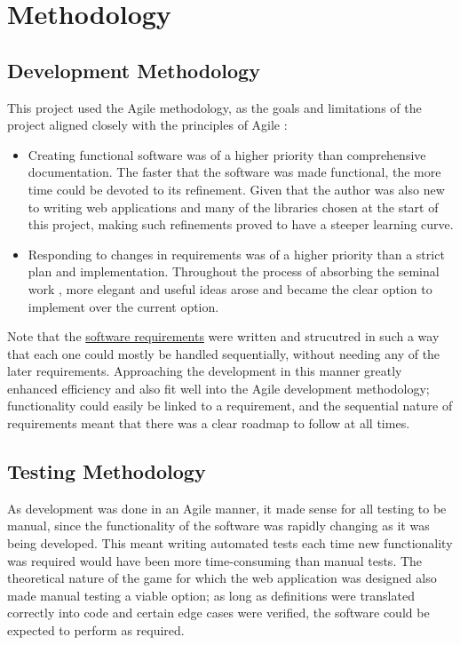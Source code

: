 \section{Methodology}

\subsection{Development Methodology}
This project used the Agile methodology, as the goals and limitations of the project aligned closely with the principles of Agile \cite{agilePrinciples}:
\begin{itemize}
    \item Creating functional software was of a higher priority than comprehensive documentation. The faster that the software was made functional, the more time could be devoted to its refinement. Given that the author was also new to writing web applications and many of the libraries chosen at the start of this project, making such refinements proved to have a steeper learning curve.
    \item Responding to changes in requirements was of a higher priority than a strict plan and implementation. Throughout the process of absorbing the seminal work \cite{chistikov2020re}, more elegant and useful ideas arose and became the clear option to implement over the current option.
\end{itemize}


Note that the \hyperref[softwareReqs]{software requirements} were written and strucutred in such a way that each one could mostly be handled sequentially, without needing any of the later requirements. Approaching the development in this manner greatly enhanced efficiency and also fit well into the Agile development methodology; functionality could easily be linked to a requirement, and the sequential nature of requirements meant that there was a clear roadmap to follow at all times.

\subsection{Testing Methodology}
As development was done in an Agile manner, it made sense for all testing to be manual, since the functionality of the software was rapidly changing as it was being developed. This meant writing automated tests each time new functionality was required would have been more time-consuming than manual tests. The theoretical nature of the game for which the web application was designed also made manual testing a viable option; as long as definitions were translated correctly into code and certain edge cases were verified, the software could be expected to perform as required.

